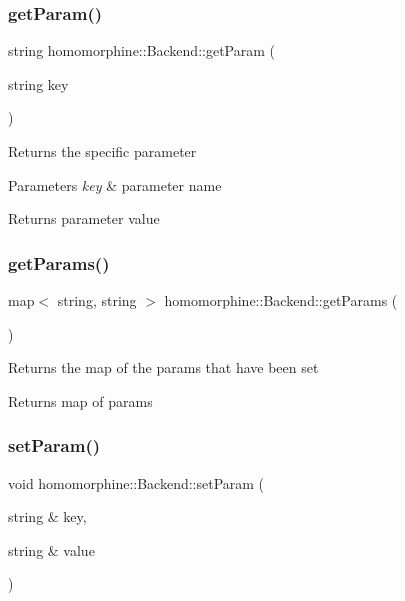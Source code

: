 \subsubsection{\texorpdfstring{getParam()}{getParam()}}
{\footnotesize\ttfamily string homomorphine\+::\+Backend\+::get\+Param (\begin{DoxyParamCaption}\item[{string}]{key }\end{DoxyParamCaption})}

Returns the specific parameter


\begin{DoxyParams}{Parameters}
{\em key} & parameter name \\
\hline
\end{DoxyParams}
\begin{DoxyReturn}{Returns}
parameter value 
\end{DoxyReturn}
\mbox{\label{classhomomorphine_1_1_backend_a107e05b3bd55271356a57fbc0c1df091}} 
\subsubsection{\texorpdfstring{getParams()}{getParams()}}
{\footnotesize\ttfamily map$<$ string, string $>$ homomorphine\+::\+Backend\+::get\+Params (\begin{DoxyParamCaption}{ }\end{DoxyParamCaption})}

Returns the map of the params that have been set

\begin{DoxyReturn}{Returns}
map of params 
\end{DoxyReturn}
\mbox{\label{classhomomorphine_1_1_backend_aacb924f4de6d50347d550da85aec15a2}} 
\subsubsection{\texorpdfstring{setParam()}{setParam()}}
{\footnotesize\ttfamily void homomorphine\+::\+Backend\+::set\+Param (\begin{DoxyParamCaption}\item[{string \&}]{key,  }\item[{string \&}]{value }\end{DoxyParamCaption})}

